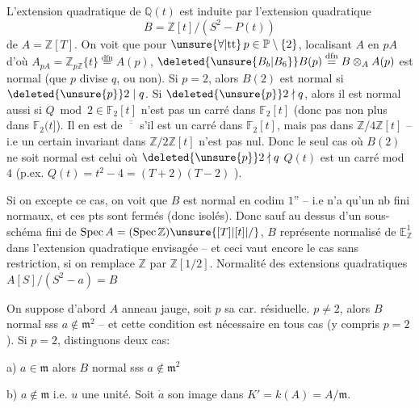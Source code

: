 L'extension quadratique de $\mathbb Q(t)$ est induite par l'extension quadratique
\[
B=\mathbb Z[t]/(S^2-P(t))
\]
de $A=\mathbb Z[T]$. On voit que pour $\unsure{\forall|\mathrm{tt}}\,p\in\mathbb P\setminus\{2\}$, localisant $A$ en $pA$ d'où $A_{pA}=\mathbb Z_{p\mathbb Z}\{t\}\overset{\mathrm{dfn}}=A(p)$, $\deleted{\unsure{B_b|B_6}}B(p)\overset{\mathrm{dfn}}=B\otimes_A A(p)$ est normal (que $p$ divise $q$, ou non). Si $p=2$, alors $B(2)$ est normal si $\deleted{\unsure{p}}2\mid q$. Si $\deleted{\unsure{p}}2\nmid q$, alors il est normal aussi si $Q\bmod 2\in\mathbb F_2[t]$ n'est pas un carré dans $\mathbb F_2[t]$ (donc pas non plus dans $\mathbb F_2(t]$).  Il en est de $\overline{\overline{\phantom{m}}}$ s'il est un carré dans $\mathbb F_2[t]$, mais pas dans $\mathbb Z/4\mathbb Z[t]$ -- i.e un certain invariant dans $\mathbb Z/2\mathbb Z[t]$ n'est pas nul. Donc le seul cas où $B(2)$ ne soit normal est celui où $\deleted{\unsure{p}}2\nmid q$  $Q(t)$ est un carré mod $4$ (p.ex. $Q(t)=t^2-4=(T+2)(T-2)$ ).

Si on excepte ce cas, on voit que $B$ est normal en codim $1$'' -- i.e  n'a qu'un nb fini  normaux, et ces pts sont fermés (donc isolés). Donc  sauf  au dessus d'un sous-schéma fini de $\mathrm{Spec}\,A=(\mathrm{Spec}\,\mathbb Z)\unsure{[T]|[t]|/}$, $B$ représente  normalisé de $\mathbb E^1_{\mathbb Z}$ dans l'extension quadratique envisagée -- et ceci vaut encore le cas sans restriction, si on remplace $\mathbb Z$ par $\mathbb Z[1/2]$.
Normalité des extensions quadratiques \quad $A[S]/(S^2-a)=B$

On suppose d'abord $A$ anneau jauge, soit $p$ sa car. résiduelle.
$p\ne2$, alors $B$ normal sss $a\notin\mathfrak m^2$ -- et cette condition est nécessaire en tous cas (y compris $p=2$). Si $p=2$, distinguons deux cas:

a) $a\in\mathfrak m$ alors $B$ normal sss $a\notin\mathfrak m^2$

b) $a\notin\mathfrak m$ i.e. $u$ une unité. Soit $\dot a$ son image dans $K'=k(A)=A/\mathfrak m$.

